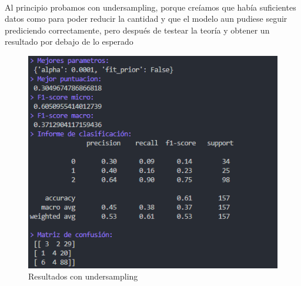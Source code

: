 \documentclass{report}
\begin{document}
                \paragraph*{}
                {
                    Al principio probamos con undersampling, porque creíamos que había suficientes datos como para poder reducir la cantidad y que el modelo aun pudiese seguir prediciendo correctamente, pero después de testear la teoría y obtener un resultado por debajo de lo esperado \color{red}{Peor puntacion:}
                }
                \begin{figure}[H]
                    \centering
                    \includegraphics[width=\textwidth]{img/undersampling.png}
                    \caption{Resultados con undersampling}
                \end{figure}
\end{document}
